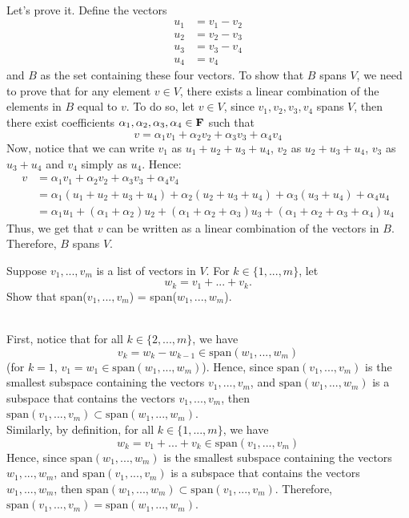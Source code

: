 \begin{solution}
    \\ Let's prove it. Define the vectors
    \begin{align*}
        u_1 &= v_1 - v_2 \\ u_2 &= v_2 - v_3 \\ u_3 &= v_3 - v_4 \\ u_4 &= v_4
    \end{align*}
    and $B$ as the set containing these four vectors. To show that $B$ spans $V$, we need to prove that for any element $v \in V$, there exists a linear combination of the elements in $B$ equal to $v$. To do so, let $v \in V$, since $v_1, v_2, v_3, v_4$ spans $V$, then there exist coefficients $\alpha_1, \alpha_2, \alpha_3, \alpha_4 \in \mathbf{F}$ such that
    $$v = \alpha_1 v_1 + \alpha_2 v_2 + \alpha_3 v_3 + \alpha_4 v_4$$
    Now, notice that we can write $v_1$ as $u_1 + u_2 + u_3 + u_4$, $v_2$ as $u_2 + u_3 + u_4$, $v_3$ as $u_3 + u_4$ and $v_4$ simply as $u_4$. Hence:
    \begin{align*}
        v &= \alpha_1 v_1 + \alpha_2 v_2 + \alpha_3 v_3 + \alpha_4 v_4 \\
        &= \alpha_1 (u_1 + u_2 + u_3 + u_4) + \alpha_2 (u_2 + u_3 + u_4) + \alpha_3 (u_3 + u_4) + \alpha_4 u_4 \\
        &= \alpha_1 u_1 + (\alpha_1 + \alpha_2)u_2 + (\alpha_1 + \alpha_2 + \alpha_3)u_3 + (\alpha_1 + \alpha_2 + \alpha_3 + \alpha_4)u_4
    \end{align*}
    Thus, we get that $v$ can be written as a linear combination of the vectors in $B$. Therefore, $B$ spans $V$.\\
\end{solution}

\begin{exercise}
    Suppose $v_1, ..., v_m$ is a list of vectors in $V$. For $k \in \{1, ...,m\}$, let 
    $$w_k = v_1 + ... + v_k.$$
    Show that span($v_1, ..., v_m$) = span($w_1, ..., w_m$).\\
\end{exercise}

\begin{solution}
    \\ First, notice that for all $k \in \{2, ..., m\}$, we have
    $$v_k = w_k - w_{k-1} \in \text{span}(w_1, ..., w_m)$$
    (for $k=1$, $v_1 = w_1 \in \text{span}(w_1, ..., w_m)$). Hence, since $\text{span}(v_1, ..., v_m)$ is the smallest subspace containing the vectors $v_1, ..., v_m$, and $\text{span}(w_1, ..., w_m)$ is a subspace that contains the vectors $v_1, ..., v_m$, then $\text{span}(v_1, ..., v_m) \subset \text{span}(w_1, ..., w_m)$.\\
    Similarly, by definition, for all $k \in \{1, ..., m\}$, we have
    $$w_k = v_1 + ... + v_k \in \text{span}(v_1, ..., v_m)$$
    Hence, since $\text{span}(w_1, ..., w_m)$ is the smallest subspace containing the vectors $w_1, ..., w_m$, and $\text{span}(v_1, ..., v_m)$ is a subspace that contains the vectors $w_1, ..., w_m$, then $\text{span}(w_1, ..., w_m) \subset \text{span}(v_1, ..., v_m)$. Therefore, $\text{span}(v_1, ..., v_m) = \text{span}(w_1, ..., w_m)$.\\
\end{solution}

